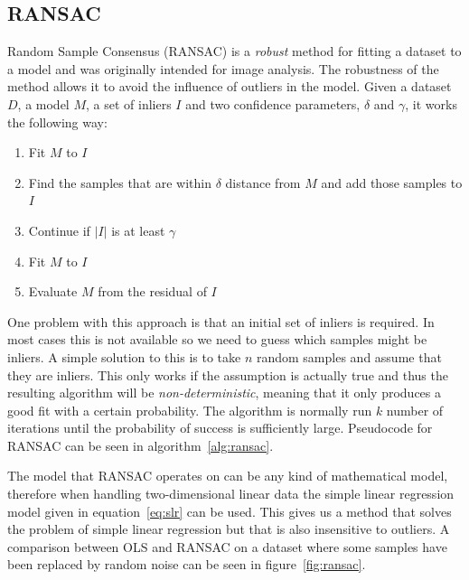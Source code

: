 \documentclass[a4paper]{report}
\begin{document}
\subsection{RANSAC}
\label{sec:ransac}
Random Sample Consensus (RANSAC) \citep{fischler81} is a \emph{robust} method
for fitting a dataset to a model and was originally intended for image
analysis. The robustness of the method allows it to avoid the influence of
outliers in the model. Given a dataset $D$, a model $M$, a set of inliers $I$
and two confidence parameters, $\delta$ and $\gamma$, it works the following
way:

\begin{enumerate}
    \item Fit $M$ to $I$
    \item Find the samples that are within $\delta$ distance from $M$ and add
        those samples to $I$
    \item Continue if $|I|$ is at least $\gamma$
    \item Fit $M$ to $I$
    \item Evaluate $M$ from the residual of $I$
\end{enumerate}

One problem with this approach is that an initial set of inliers is required.
In most cases this is not available so we need to guess which samples might be
inliers. A simple solution to this is to take $n$ random samples and assume
that they are inliers. This only works if the assumption is actually true and
thus the resulting algorithm will be \emph{non-deterministic}, meaning that it
only produces a good fit with a certain probability. The algorithm is normally
run $k$ number of iterations until the probability of success is sufficiently
large. Pseudocode for RANSAC can be seen in algorithm~\ref{alg:ransac}.

The model that RANSAC operates on can be any kind of mathematical model, 
therefore when handling two-dimensional linear data the simple linear
regression model given in equation~\ref{eq:slr} can be used. This gives us a
method that solves the problem of simple linear regression but that is also
insensitive to outliers. A comparison between OLS and RANSAC on a dataset where
some samples have been replaced by random noise can be seen in
figure~\ref{fig:ransac}.
\end{document}
